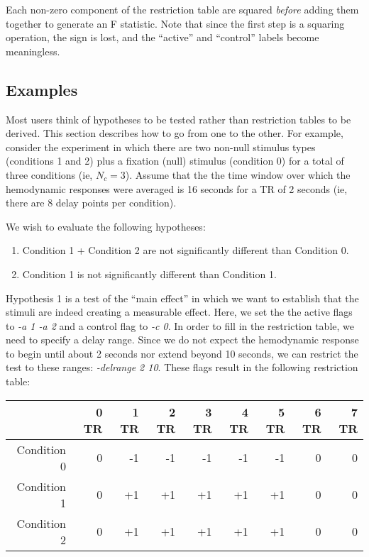 \documentclass[10pt]{article}
\begin{document}
Each non-zero component of the restriction table are squared {\em
before} adding them together to generate an F statistic. Note that
since the first step is a squaring operation, the sign is lost,
and the ``active'' and ``control'' labels become meaningless.

\subsection{Examples}

Most users think of hypotheses to be tested rather than restriction
tables to be derived.  This section describes how to go from one to
the other.  For example, consider the experiment in which there are
two non-null stimulus types (conditions 1 and 2) plus a fixation
(null) stimulus (condition 0) for a total of three conditions (ie,
$N_c=3$).  Assume that the the time window over which the hemodynamic
responses were averaged is 16 seconds for a TR of 2 seconds (ie, there
are 8 delay points per condition).  

We wish to evaluate the following hypotheses:
\begin{enumerate}
\item Condition 1 + Condition 2 are not significantly different than
Condition 0.
\item Condition 1 is not significantly different than Condition 1.
\end{enumerate}

Hypothesis 1 is a test of the ``main effect'' in which we want to
establish that the stimuli are indeed creating a measurable effect.
Here, we set the the active flags to {\em -a 1 -a 2} and a control
flag to {\em -c 0}.  In order to fill in the restriction table, we
need to specify a delay range.  Since we do not expect the hemodynamic
response to begin until about 2 seconds nor extend beyond 10 seconds,
we can restrict the test to these ranges: {\em -delrange 2 10}.  These
flags result in the following restriction table:\\

\begin{tabular}{|r||r|r|r|r|r|r|r|r|}\hline
& 0 TR & 1  TR & 2  TR & 3  TR & 4  TR & 5  TR & 6  TR & 7  TR\\ \hline \hline
Condition 0 & 0 &-1 &-1 &-1 &-1 &-1  & 0  & 0    \\ \hline
Condition 1 & 0 &+1 &+1 &+1 &+1 &+1  & 0  & 0    \\ \hline
Condition 2 & 0 &+1 &+1 &+1 &+1 &+1  & 0  & 0    \\ \hline
\end{tabular}\\
\end{document}
